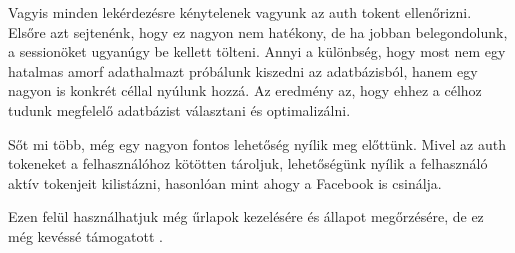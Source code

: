 Vagyis minden lekérdezésre kénytelenek vagyunk az auth tokent ellenőrizni. Elsőre azt sejtenénk, hogy ez nagyon nem hatékony, de ha jobban belegondolunk, a sessionöket ugyanúgy be kellett tölteni. Annyi a különbség, hogy most nem egy hatalmas amorf adathalmazt próbálunk kiszedni az adatbázisból, hanem egy nagyon is konkrét céllal nyúlunk hozzá. Az eredmény az, hogy ehhez a célhoz tudunk megfelelő adatbázist választani és optimalizálni.

Sőt mi több, még egy nagyon fontos lehetőség nyílik meg előttünk. Mivel az auth tokeneket a felhasználóhoz kötötten tároljuk, lehetőségünk nyílik a felhasználó aktív tokenjeit kilistázni, hasonlóan mint ahogy a Facebook is csinálja.

Ezen felül használhatjuk még űrlapok kezelésére és állapot megőrzésére, de ez még kevéssé támogatott \cite{session}.

























